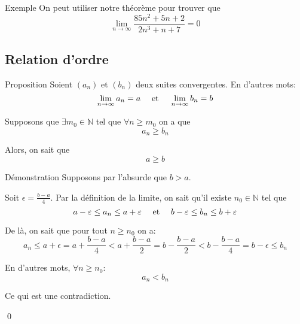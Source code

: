 \documentclass[a4paper]{article}
\begin{document}
\begin{parag}{Exemple}
    On peut utiliser notre théorème pour trouver que
    \[\lim_{n \to \infty} \frac{85n^2 + 5n + 2}{2n^3 + n + 7} = 0\]
\end{parag}

\subsection{Relation d'ordre}
\begin{parag}{Proposition}
    Soient $\left(a_n\right)$ et $\left(b_n\right)$ deux suites convergentes. En d'autres mots: 
    \[\lim_{n \to \infty} a_n = a \quad \text{ et } \quad \lim_{n \to \infty} b_n = b\]
    
    Supposons que $\exists m_0 \in \mathbb{N}$ tel que $\forall n \geq m_0$ on a que 
    \[a_n \geq b_n\]
    
    Alors, on sait que 
    \[a \geq b\]
    
    \begin{subparag}{Démonstration}
        Supposons par l'absurde que $b > a$.

        Soit $\epsilon = \frac{b-a}{4}$. Par la définition de la limite, on sait qu'il existe $n_0 \in \mathbb{N}$ tel que 
        \[a - \varepsilon \leq a_n \leq a + \varepsilon \quad \text{ et } \quad b - \varepsilon \leq b_n \leq b + \varepsilon\]

        De là, on sait que pour tout $n \geq n_0$ on a: 
        \[a_n \leq a + \epsilon = a + \frac{b-a}{4} < a + \frac{b-a}{2} = b - \frac{b-a}{2} < b - \frac{b-a}{4} = b - \epsilon \leq b_n\]

        En d'autres mots, $\forall n \geq n_0$: 
        \[a_n < b_n\]
        
        Ce qui est une contradiction.

        \qed
    \end{subparag}
\end{parag}
\end{document}

